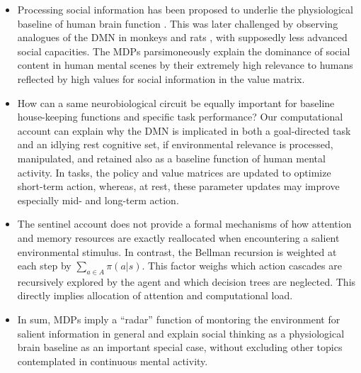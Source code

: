 \documentclass{article} %
\begin{document}
 \begin{itemize}
    \item Processing social information has been proposed to underlie the
    physiological baseline of human brain function
    \citep{schilbach2008minds}. This was later challenged by observing
    analogues of the DMN in monkeys \citep{mantini2011default}
    and rats \citep{lu2012rat}, with
    supposedly less advanced social capacities.
    The MDPs parsimoneously explain the dominance of social content in
    human mental scenes by their extremely high relevance to humans
    reflected by high values for social information in the value matrix.
    \item How can a same neurobiological circuit be equally important
    for baseline house-keeping functions and specific task performance?
    Our computational account can explain why the DMN is implicated
    in both a goal-directed task and an idlying rest cognitive set,
    if environmental relevance is processed, manipulated, and retained
    also as a baseline function of human mental activity.
    In tasks, the policy and value matrices are updated to optimize short-term action,
    whereas, at rest, these parameter updates may
    improve especially mid- and long-term action.
    \item The sentinel account does not provide a formal mechanisms of
    how attention and memory resources are exactly reallocated when
    encountering a salient environmental stimulus. In contrast,
    the Bellman recursion is weighted at each step by
    $\sum_{a \in A}\pi(a|s)$. This factor weighs which action cascades
    are recursively explored by the agent and which decision trees are neglected.
    This directly implies allocation of attention and computational load.
    \item In sum,
    MDPs imply a ``radar'' function of montoring the environment for salient information
    in general and explain social thinking as a physiological brain baseline
    as an important special case, without excluding other topics
    contemplated in continuous mental activity.
 \end{itemize}
\end{document}
